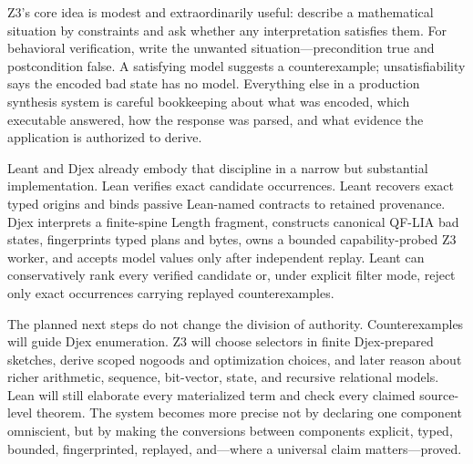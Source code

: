 \documentclass[10pt,letterpaper,oneside]{report}
\begin{document}
Z3's core idea is modest and extraordinarily useful: describe a mathematical situation by constraints and ask whether any interpretation satisfies them. For behavioral verification, write the unwanted situation---precondition true and postcondition false. A satisfying model suggests a counterexample; unsatisfiability says the encoded bad state has no model. Everything else in a production synthesis system is careful bookkeeping about what was encoded, which executable answered, how the response was parsed, and what evidence the application is authorized to derive.

Leant and Djex already embody that discipline in a narrow but substantial implementation. Lean verifies exact candidate occurrences. Leant recovers exact typed origins and binds passive Lean-named contracts to retained provenance. Djex interprets a finite-spine Length fragment, constructs canonical QF-LIA bad states, fingerprints typed plans and bytes, owns a bounded capability-probed Z3 worker, and accepts model values only after independent replay. Leant can conservatively rank every verified candidate or, under explicit filter mode, reject only exact occurrences carrying replayed counterexamples.

The planned next steps do not change the division of authority. Counterexamples will guide Djex enumeration. Z3 will choose selectors in finite Djex-prepared sketches, derive scoped nogoods and optimization choices, and later reason about richer arithmetic, sequence, bit-vector, state, and recursive relational models. Lean will still elaborate every materialized term and check every claimed source-level theorem. The system becomes more precise not by declaring one component omniscient, but by making the conversions between components explicit, typed, bounded, fingerprinted, replayed, and---where a universal claim matters---proved.
\end{document}
